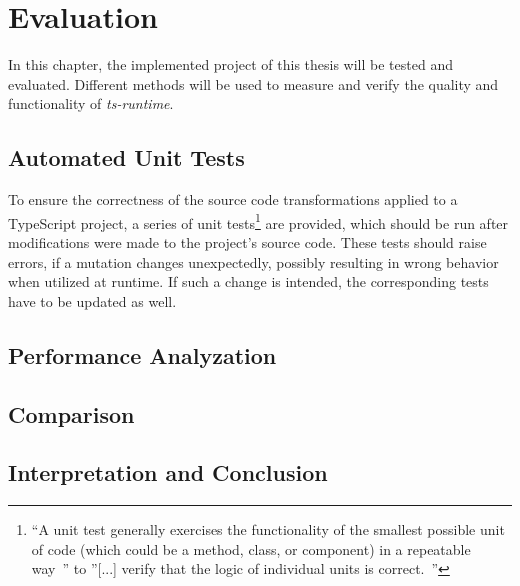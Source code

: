 
\chapter{Evaluation}
\label{cha:evaluation}

In this chapter, the implemented project of this thesis will be tested and evaluated. Different methods will be used to measure and verify the quality and functionality of \emph{ts-runtime}.

\section{Automated Unit Tests}
\label{sec:automated-unit-tests}

To ensure the correctness of the source code transformations applied to a TypeScript project, a series of unit tests\footnote{``A unit test generally exercises the functionality of the smallest possible unit of code (which could be a method, class, or component) in a repeatable way~\cite{UnitTests:Android}'' to ''[...] verify that the logic of individual units is correct.~\cite{UnitTests:Android}''} are provided, which should be run after modifications were made to the project's source code. These tests should raise errors, if a mutation changes unexpectedly, possibly resulting in wrong behavior when utilized at runtime. If such a change is intended, the corresponding tests have to be updated as well.

\section{Performance Analyzation}
\label{sec:performance-analyzation}



\section{Comparison}
\label{sec:evalutaion-comparison}

%
%

\section{Interpretation and Conclusion}
\label{sec:interpretation-conclusion}
